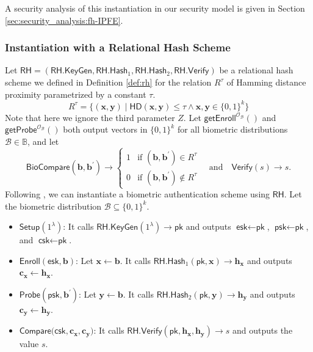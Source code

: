 A security analysis of this instantiation in our security model is given in Section \ref{sec:security_analysis:fh-IPFE}.


\subsubsection{Instantiation with a Relational Hash Scheme}
\label{sec:rh-instantiation}

Let $\textsf{RH} = (\textsf{RH.KeyGen}, \textsf{RH.Hash}_1, \textsf{RH.Hash}_2, \textsf{RH.Verify})$ be a relational hash scheme we defined in Definition \ref{def:rh} for the relation $R^\tau$ of Hamming distance proximity parametrized by a constant $\tau$.
\[
	R^\tau = \{ (\mathbf{x}, \mathbf{y}) \mid \textsf{HD}(\mathbf{x}, \mathbf{y}) \leq \tau \wedge \mathbf{x}, \mathbf{y} \in \{0,1\}^k \}
\]
Note that here we ignore the third parameter $Z$.
Let $\textsf{getEnroll}^{\mathcal{O}_{\mathcal{B}}}()$ and $\textsf{getProbe}^{\mathcal{O}_{\mathcal{B}}}()$ both output vectors in $ \{0, 1\}^k$ for all biometric distributions $\mathcal{B} \in \mathbb{B}$, and let 
\[
	\textsf{BioCompare}(\mathbf{b}, \mathbf{b}^\prime) \to
	\begin{cases}
		1 & \text{if } (\mathbf{b}, \mathbf{b}^\prime) \in R^\tau \\
		0 & \text{if } (\mathbf{b}, \mathbf{b}^\prime) \notin R^\tau
	\end{cases} \quad \text{and} \quad
	\textsf{Verify}(s) \to s.
\]
Following \cite{cryptoeprint:2014/394}, we can instantiate a biometric authentication scheme using $\textsf{RH}$.  Let the biometric distribution $\mathcal{B} \subseteq \{0,1\}^k$.

\begin{itemize}

	\item $\textsf{Setup}(1^\lambda)$: It calls $\textsf{RH.KeyGen}(1^\lambda) \to \textsf{pk}$ and outputs $\textsf{esk} \gets \textsf{pk}$, $\textsf{psk} \gets \textsf{pk}$, and $\textsf{csk} \gets \textsf{pk}$.

	\item $\textsf{Enroll}(\textsf{esk}, \mathbf{b})$: Let $\mathbf{x} \gets \mathbf{b}$. It calls $\textsf{RH.Hash}_1(\textsf{pk}, \mathbf{x}) \to \mathbf{h_x}$ and outputs $\mathbf{c_x} \gets \mathbf{h_x}$.

	\item $\textsf{Probe}(\textsf{psk}, \mathbf{b}^\prime)$: Let $\mathbf{y} \gets \mathbf{b}$. It calls $\textsf{RH.Hash}_2(\textsf{pk}, \mathbf{y}) \to \mathbf{h_y}$ and outputs $\mathbf{c_y} \gets \mathbf{h_y}$.

	\item $\textsf{Compare}(\textsf{csk}, \mathbf{c_x}, \mathbf{c_y)}$: It calls $\textsf{RH.Verify}(\textsf{pk}, \mathbf{h_x}, \mathbf{h_y}) \to s$ and outputs the value $s$.

\end{itemize}

